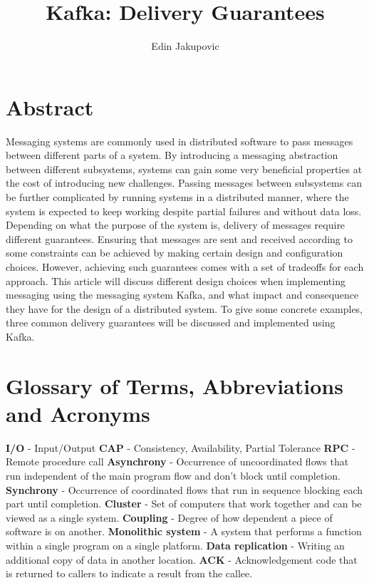 \documentclass[11pt]{article}
\author{Edin Jakupovic}
\title{Kafka: Delivery Guarantees}
\begin{document}
\maketitle
\clearpage


\section*{Abstract}
Messaging systems are commonly used in distributed software to pass messages between different parts of a system.
By introducing a messaging abstraction between different subsystems, systems can gain some very beneficial properties at the cost of introducing new challenges.
\newline
\newline
Passing messages between subsystems can be further complicated by running systems in a distributed manner, where the system is expected to keep working despite partial failures and without data loss.
\newline
\newline
Depending on what the purpose of the system is, delivery of messages require different guarantees. Ensuring that messages are sent and received according to some constraints can be achieved by making certain design and configuration choices. However, achieving such guarantees comes with a set of tradeoffs for each approach.
\newline
\newline
This article will discuss different design choices when implementing messaging using the messaging system Kafka, and what impact and consequence they have for the design of a distributed system. To give some concrete examples, three common delivery guarantees will be discussed and implemented using Kafka.

\clearpage
\section*{Glossary of Terms, Abbreviations and Acronyms}
\textbf{I/O} - Input/Output
\newline
\textbf{CAP} - Consistency, Availability, Partial Tolerance
\newline
\textbf{RPC} - Remote procedure call
\newline
\textbf{Asynchrony} - Occurrence of uncoordinated flows that run independent of the main program flow and don't block until completion.
\newline
\textbf{Synchrony} - Occurrence of coordinated flows that run in sequence blocking each part until completion.
\newline
\textbf{Cluster} - Set of computers that work together and can be viewed as a single system.
\newline
\textbf{Coupling} - Degree of how dependent a piece of software is on another.
\newline
\textbf{Monolithic system} - A system that performs a function within a single program on a single platform.
\newline
\textbf{Data replication} - Writing an additional copy of data in another location.
\newline
\textbf{ACK} - Acknowledgement code that is returned to callers to indicate a result from the callee.
\end{document}
